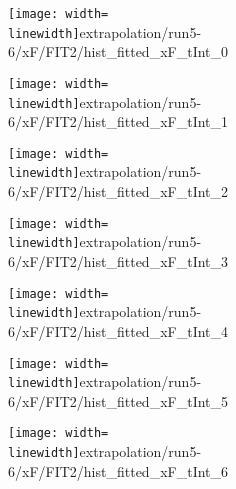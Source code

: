 \begin{figure}
\begin{subfigure}{0.45\linewidth}
\texttt{[image: width=\\linewidth]}{extrapolation/run5-6/xF/FIT2/hist_fitted_xF_tInt_0}
\end{subfigure}
\begin{subfigure}{0.45\linewidth}
\texttt{[image: width=\\linewidth]}{extrapolation/run5-6/xF/FIT2/hist_fitted_xF_tInt_1}
\end{subfigure}
\begin{subfigure}{0.45\linewidth}
\texttt{[image: width=\\linewidth]}{extrapolation/run5-6/xF/FIT2/hist_fitted_xF_tInt_2}
\end{subfigure}
\begin{subfigure}{0.45\linewidth}
\texttt{[image: width=\\linewidth]}{extrapolation/run5-6/xF/FIT2/hist_fitted_xF_tInt_3}
\end{subfigure}
\begin{subfigure}{0.45\linewidth}
\texttt{[image: width=\\linewidth]}{extrapolation/run5-6/xF/FIT2/hist_fitted_xF_tInt_4}
\end{subfigure}
\begin{subfigure}{0.45\linewidth}
\texttt{[image: width=\\linewidth]}{extrapolation/run5-6/xF/FIT2/hist_fitted_xF_tInt_5}
\end{subfigure}
\begin{subfigure}{0.45\linewidth}
\texttt{[image: width=\\linewidth]}{extrapolation/run5-6/xF/FIT2/hist_fitted_xF_tInt_6}
\end{subfigure}
\end{figure}
